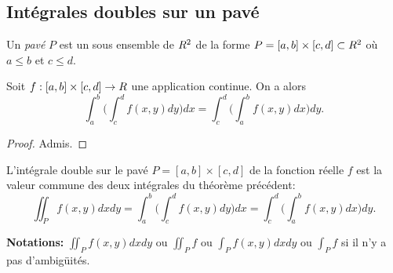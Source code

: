 \begin{center}
                   \tikzexternaldisable
               \end{center}


\subsection{Intégrales doubles sur un pavé}

\begin{definition}
	Un \emph{pavé} $P$   est un sous ensemble de $R^2$ de la forme $P = [a,b] \times [c,d] \subset R^2$ où $a\leq b$  et $ c\leq d$.	
\end{definition}

\begin{theorem}
	Soit $f:[a,b] \times [c,d] \to R$ une application continue. On a alors 
	\[
 \int_a^b  \bigg(\int_c^d f(x,y) dy \bigg) dx  = \int_c^d \bigg(\int_a^b   f(x,y) dx \bigg) dy.
	\]
\end{theorem}

\begin{proof}
	Admis. 
\end{proof}

\sld{\vfill\pagebreak[5]}%

\begin{definition}
	L'intégrale double sur le pavé $P= [a,b] \times [c,d]$ de la fonction réelle $f$ est la valeur commune des deux intégrales du théorème précédent:
	\[
		\iint_P f(x,y) dx dy = \int_a^b  \bigg(\int_c^d f(x,y) dy \bigg) dx  = \int_c^d \bigg(\int_a^b   f(x,y) dx \bigg) dy.
	\]
\end{definition}

{\bf\sffamily Notations:} $\iint_P f(x,y) dx dy$ ou $\iint_P f  $ ou $	\int_P f(x,y) dx dy  $ ou $ \int_P f$ si il n'y a pas d'ambigüités.

